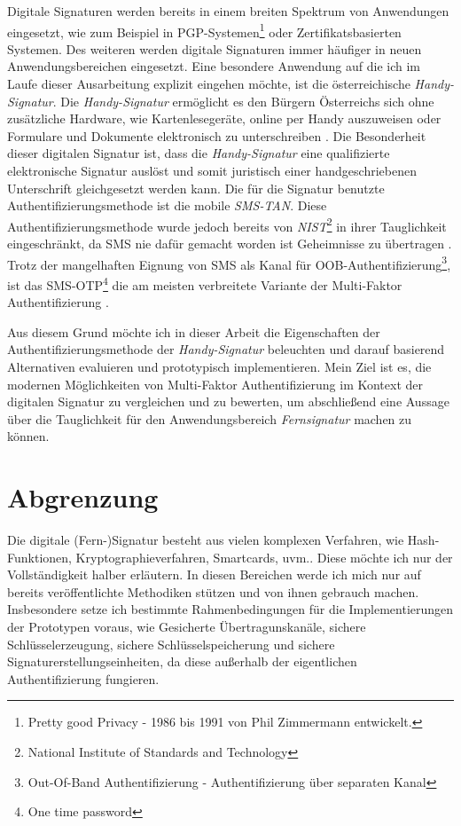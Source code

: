 \documentclass[11pt,a4paper,ngerman]{report}
\begin{document}
Digitale Signaturen werden bereits in einem breiten Spektrum von Anwendungen eingesetzt, wie zum Beispiel in PGP-Systemen\footnote{Pretty good Privacy - 1986 bis 1991 von Phil Zimmermann entwickelt.} oder Zertifikatsbasierten Systemen. Des weiteren werden digitale Signaturen immer häufiger in neuen Anwendungsbereichen eingesetzt. Eine besondere Anwendung auf die ich im Laufe dieser Ausarbeitung explizit eingehen möchte, ist die österreichische \textit{Handy-Signatur}. Die \textit{Handy-Signatur} ermöglicht es den Bürgern Österreichs sich ohne zusätzliche Hardware, wie Kartenlesegeräte, online per Handy auszuweisen oder Formulare und Dokumente elektronisch zu unterschreiben \cite{handySigOnline}. Die Besonderheit dieser digitalen Signatur ist, dass die \textit{Handy-Signatur} eine qualifizierte elektronische Signatur auslöst und somit juristisch einer handgeschriebenen Unterschrift gleichgesetzt werden kann. Die für die Signatur benutzte Authentifizierungsmethode ist die mobile \textit{SMS-TAN}. Diese Authentifizierungsmethode wurde jedoch bereits von \textit{NIST}\footnote{National Institute of Standards and Technology} in ihrer Tauglichkeit eingeschränkt, da SMS nie dafür gemacht worden ist Geheimnisse zu übertragen \cite{mobileSec,NIST800-63B}. Trotz der mangelhaften Eignung von SMS als Kanal für OOB-Authentifizierung\footnote{Out-Of-Band Authentifizierung - Authentifizierung über separaten Kanal}, ist das SMS-OTP\footnote{One time password} die am meisten verbreitete Variante der Multi-Faktor Authentifizierung \cite[Abb. 3]{fido17}.

Aus diesem Grund möchte ich in dieser Arbeit die Eigenschaften der Authentifizierungsmethode der \textit{Handy-Signatur} beleuchten und darauf basierend Alternativen evaluieren und prototypisch implementieren. Mein Ziel ist es, die modernen Möglichkeiten von Multi-Faktor Authentifizierung im Kontext der digitalen Signatur zu vergleichen und zu bewerten, um abschließend eine Aussage über die Tauglichkeit für den Anwendungsbereich \textit{Fernsignatur} machen zu können.

\section*{Abgrenzung}
Die digitale (Fern-)Signatur besteht aus vielen komplexen Verfahren, wie Hash-Funktionen, Kryptographieverfahren, Smartcards, uvm.. Diese möchte ich nur der Vollständigkeit halber erläutern. In diesen Bereichen werde ich mich nur auf bereits veröffentlichte Methodiken stützen und von ihnen gebrauch machen. Insbesondere setze ich bestimmte Rahmenbedingungen für die Implementierungen der Prototypen voraus, wie Gesicherte Übertragunskanäle, sichere Schlüsselerzeugung, sichere Schlüsselspeicherung und sichere Signaturerstellungseinheiten, da diese außerhalb der eigentlichen Authentifizierung fungieren.
\clearpage
\end{document}
